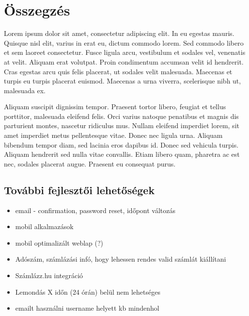 \chapter{Összegzés} %
\label{ch:sum}

Lorem ipsum dolor sit amet, consectetur adipiscing elit. In eu egestas mauris. Quisque nisl elit, varius in erat eu, dictum commodo lorem. Sed commodo libero et sem laoreet consectetur. Fusce ligula arcu, vestibulum et sodales vel, venenatis at velit. Aliquam erat volutpat. Proin condimentum accumsan velit id hendrerit. Cras egestas arcu quis felis placerat, ut sodales velit malesuada. Maecenas et turpis eu turpis placerat euismod. Maecenas a urna viverra, scelerisque nibh ut, malesuada ex.

Aliquam suscipit dignissim tempor. Praesent tortor libero, feugiat et tellus porttitor, malesuada eleifend felis. Orci varius natoque penatibus et magnis dis parturient montes, nascetur ridiculus mus. Nullam eleifend imperdiet lorem, sit amet imperdiet metus pellentesque vitae. Donec nec ligula urna. Aliquam bibendum tempor diam, sed lacinia eros dapibus id. Donec sed vehicula turpis. Aliquam hendrerit sed nulla vitae convallis. Etiam libero quam, pharetra ac est nec, sodales placerat augue. Praesent eu consequat purus.

\section{További fejlesztői lehetőségek}
\begin{itemize}
    \item email - confirmation, password reset, időpont változás
    \item mobil alkalmazások
    \item mobil optimalizált weblap (?) 
    \item Adószám, számlázási infó, hogy lehessen rendes valid számlát kiállítani
    \item Számlázz.hu integráció
    \item Lemondás X időn (24 órán) belül nem lehetséges
    \item emailt használni username helyett kb mindenhol
\end{itemize}


